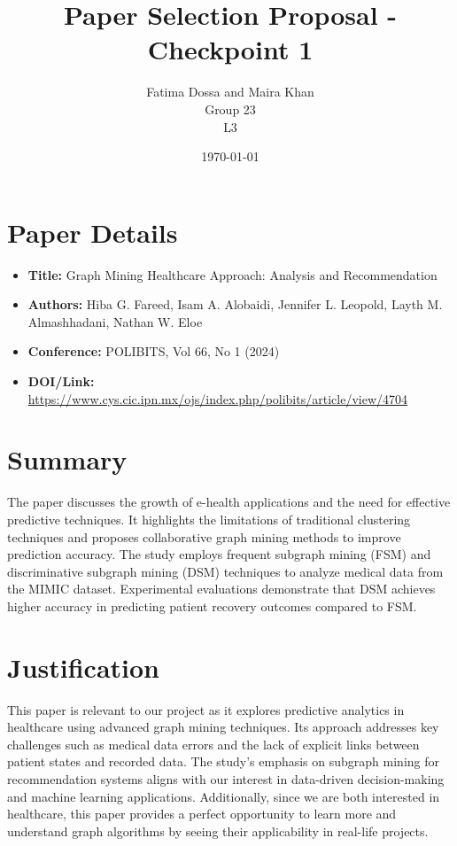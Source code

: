 \documentclass[12pt]{article}
\title{Paper Selection Proposal - Checkpoint 1 }
\author{Fatima Dossa and Maira Khan \\ Group 23  \\ L3}
\date{\today}
\begin{document}
\maketitle

\section{Paper Details}
\begin{itemize}
    \item \textbf{Title:} Graph Mining Healthcare Approach: Analysis and Recommendation 
    \item \textbf{Authors:} Hiba G. Fareed, Isam A. Alobaidi, Jennifer L. Leopold, Layth M. Almashhadani, Nathan W. Eloe 
    \item \textbf{Conference:} POLIBITS, Vol 66, No 1 (2024)
    \item \textbf{DOI/Link:} \href{https://www.cys.cic.ipn.mx/ojs/index.php/polibits/article/view/4704}{https://www.cys.cic.ipn.mx/ojs/index.php/polibits/article/view/4704}
\end{itemize}

\section{Summary}
The paper discusses the growth of e-health applications and the need for effective predictive techniques. It highlights the limitations of traditional clustering techniques and proposes collaborative graph mining methods to improve prediction accuracy. The study employs frequent subgraph mining (FSM) and discriminative subgraph mining (DSM) techniques to analyze medical data from the MIMIC dataset. Experimental evaluations demonstrate that DSM achieves higher accuracy in predicting patient recovery outcomes compared to FSM.


\section{Justification}
This paper is relevant to our project as it explores predictive analytics in healthcare using advanced graph mining techniques. Its approach addresses key challenges such as medical data errors and the lack of explicit links between patient states and recorded data. The study's emphasis on subgraph mining for recommendation systems aligns with our interest in data-driven decision-making and machine learning applications. Additionally, since we are both interested in healthcare, this paper provides a perfect opportunity to learn more and understand graph algorithms by seeing their applicability in real-life projects.
\end{document}
